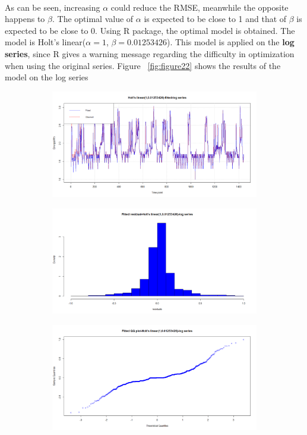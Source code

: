 \documentclass[12pt]{article}
\begin{document}
\paragraph{}
As can be seen, increasing $\alpha$ could reduce the RMSE, meanwhile the opposite happens to $\beta$. The optimal value of $\alpha$ is expected to be close to 1 and that of $\beta$ is expected to be close to 0. Using R package, the optimal model is obtained. The model is Holt's linear($\alpha=1$, $\beta=0.01253426$). This model is applied on the \textbf{log series}, since R gives a warning message regarding the difficulty in optimization when using the original series. Figure ~\ref{fig:figure22} shows the results of the model on the log series
\begin{figure}[H]
  \centering
  \begin{subfigure}[b]{0.6\linewidth}
    \includegraphics[width=\linewidth]{figure21-1.png}
  \end{subfigure}
  \begin{subfigure}[b]{0.6\linewidth}
    \includegraphics[width=\linewidth]{figure21-2.png}
  \end{subfigure}
  \begin{subfigure}[b]{0.6\linewidth}
    \includegraphics[width=\linewidth]{figure21-3.png}

\end{subfigure}
\end{figure}
\end{document}
